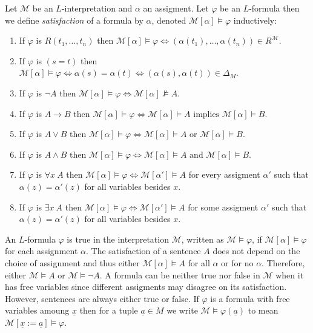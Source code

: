 \documentclass[12pt]{article}
\newcommand{\entails}{\models}
\newcommand{\Mmod}{\mathcal{M}}
\newcommand{\ul}[1]{\underline{#1}}
\newenvironment{definition}[1][Definition:]{\begin{trivlist}
\item[\hskip \labelsep {\bfseries #1}]}{\end{trivlist}}
\theoremstyle{theorem}
\theoremstyle{definition}
\theoremstyle{definition}
\theoremstyle{remark}
\theoremstyle{definition}
\theoremstyle{remark}
\begin{document}
\begin{definition}
Let $\Mmod$ be an $L$-interpretation and $\alpha$ an assigment. Let $\varphi$ be an $L$-formula then we define \textit{satisfaction} of a formula by $\alpha$, denoted $\Mmod[\alpha] \entails \varphi$ inductively:
\begin{enumerate}
\item If $\varphi$ is $R(t_1, \dots, t_n)$ then $\Mmod[\alpha] \entails \varphi \iff (\alpha(t_1), \dots, \alpha(t_n)) \in R^{\Mmod}$.
\item If $\varphi$ is $(s = t)$ then $\Mmod[\alpha] \entails \varphi \iff \alpha(s) = \alpha(t) \iff (\alpha(s), \alpha(t)) \in \Delta_M$. 
\item If $\varphi$ is $\neg A$ then $\Mmod[\alpha] \entails \varphi \iff \Mmod[\alpha] \not\entails A$.
\item If $\varphi$ is $A \to B$ then $\Mmod[\alpha] \entails \varphi \iff \Mmod[\alpha] \entails A \text{ implies } \Mmod[\alpha] \entails B$.
\item If $\varphi$ is $A \vee B$ then $\Mmod[\alpha] \entails \varphi \iff \Mmod[\alpha] \entails A \text{ or } \Mmod[\alpha] \entails B$.
\item If $\varphi$ is $A \wedge B$ then $\Mmod[\alpha] \entails \varphi \iff \Mmod[\alpha] \entails A \text{ and } \Mmod[\alpha] \entails B$.
\item If $\varphi$ is $\forall x \: A$ then $\Mmod[\alpha] \entails \varphi \iff \Mmod[\alpha'] \entails A$ for every assigment $\alpha'$ such that $\alpha(z) = \alpha'(z)$ for all variables besides $x$.
\item If $\varphi$ is $\exists x \: A$ then $\Mmod[\alpha] \entails \varphi \iff \Mmod[\alpha'] \entails A$ for some assigment $\alpha'$ such that $\alpha(z) = \alpha'(z)$ for all variables besides $x$.
\end{enumerate}
An $L$-formula $\varphi$ is true in the interpretation $\Mmod$, written as $\Mmod \entails \varphi$, if $\Mmod[\alpha] \entails \varphi$ for each assignment $\alpha$. The satisfaction of a sentence $A$ does not depend on the choice of assignment and thus either $\Mmod[\alpha] \entails A$ for all $\alpha$ or for no $\alpha$. Therefore, either $\Mmod \entails A$ or $\Mmod \entails \neg A$. A formula can be neither true nor false in $\Mmod$ when it has free variables since different assigments may disagree on its satisfaction. However, sentences are always either true or false. If $\varphi$ is a formula with free variables amoung $\ul{x}$ then for a tuple $\ul{a} \in M$ we write $\Mmod \entails \varphi(\ul{a})$ to mean $\Mmod[\ul{x} := \ul{a}] \entails \varphi$. 
\end{definition}
\end{document}

